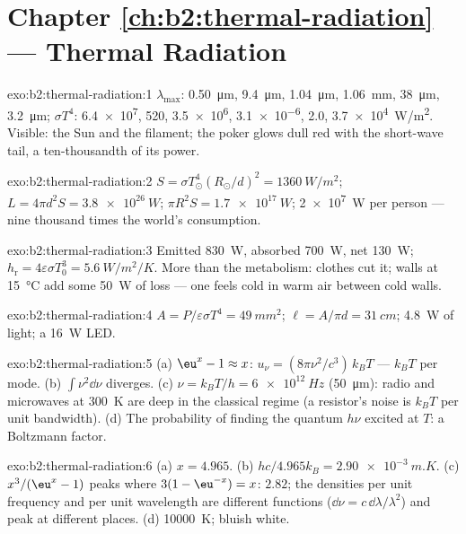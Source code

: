 \section*{Chapter \ref{ch:b2:thermal-radiation} --- Thermal Radiation}

\begin{solution}{exo:b2:thermal-radiation:1}
$\lambda_{\max}$: \qty{0.50}{\micro m}, \qty{9.4}{\micro m}, \qty{1.04}{\micro m},
\qty{1.06}{mm}, \qty{38}{\micro m}, \qty{3.2}{\micro m}; $\sigma T^4$: \qty{6.4e7}{},
\qty{520}{}, \qty{3.5e6}{}, \qty{3.1e-6}{}, \qty{2.0}{}, \qty{3.7e4}{W/m^2}. Visible:
the Sun and the filament; the poker glows dull red with the short-wave
tail, a ten-thousandth of its power.
\end{solution}

\begin{solution}{exo:b2:thermal-radiation:2}
$S = \sigma T_\odot^4(R_\odot/d)^2 = \qty{1360}{W/m^2}$; $L = 4\pi d^2S =
\qty{3.8e26}{W}$; $\pi R^2S = \qty{1.7e17}{W}$; \qty{2e7}{W} per person --- nine
thousand times the world's consumption.
\end{solution}

\begin{solution}{exo:b2:thermal-radiation:3}
Emitted \qty{830}{W}, absorbed \qty{700}{W}, net \qty{130}{W}; $h_{\text{r}} =
4\varepsilon\sigma T_0^3 = \qty{5.6}{W/m^2/K}$. More than the metabolism:
clothes cut it; walls at \qty{15}{\celsius} add some \qty{50}{W} of loss
--- one feels cold in warm air between cold walls.
\end{solution}

\begin{solution}{exo:b2:thermal-radiation:4}
$A = P/\varepsilon\sigma T^4 = \qty{49}{mm^2}$; $\ell = A/\pi d = \qty{31}{cm}$;
\qty{4.8}{W} of light; a \qty{16}{W} LED.
\end{solution}

\begin{solution}{exo:b2:thermal-radiation:5}
(a) $\eu^x - 1 \approx x$: $u_\nu = (8\pi\nu^2/c^3)\,k_BT$ --- $k_BT$ per mode.
(b) $\int\nu^2\dd\nu$ diverges. (c) $\nu = k_BT/h = \qty{6e12}{Hz}$ (\qty{50}{\micro m}):
radio and microwaves at \qty{300}{K} are deep in the classical regime (a
resistor's noise is $k_BT$ per unit bandwidth). (d) The probability of
finding the quantum $h\nu$ excited at $T$: a Boltzmann factor.
\end{solution}

\begin{solution}{exo:b2:thermal-radiation:6}
(a) $x = 4.965$. (b) $hc/4.965k_B = \qty{2.90e-3}{m.K}$. (c) $x^3/(\eu^x - 1)$
peaks where $3(1 - \eu^{-x}) = x$: $2.82$; the densities per unit frequency
and per unit wavelength are different functions ($\dd\nu = c\,\dd\lambda/\lambda^2$)
and peak at different places. (d) \qty{10000}{K}; bluish white.
\end{solution}

